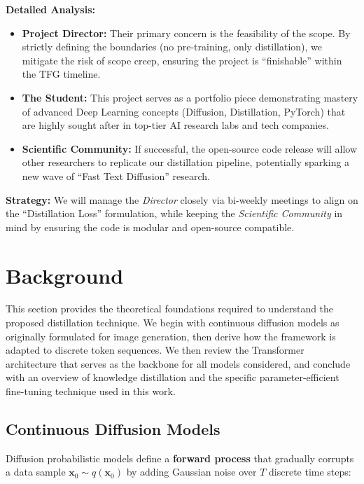 \documentclass[11pt, a4paper]{article}
\begin{document}
\textbf{Detailed Analysis:}
\begin{itemize}
    \item \textbf{Project Director:} Their primary concern is the feasibility of the scope. By strictly defining the boundaries (no pre-training, only distillation), we mitigate the risk of scope creep, ensuring the project is ``finishable'' within the TFG timeline.
    \item \textbf{The Student:} This project serves as a portfolio piece demonstrating mastery of advanced Deep Learning concepts (Diffusion, Distillation, PyTorch) that are highly sought after in top-tier AI research labs and tech companies.
    \item \textbf{Scientific Community:} If successful, the open-source code release will allow other researchers to replicate our distillation pipeline, potentially sparking a new wave of ``Fast Text Diffusion'' research.
\end{itemize}

\noindent \textbf{Strategy:} We will manage the \textit{Director} closely via bi-weekly meetings to align on the ``Distillation Loss'' formulation, while keeping the \textit{Scientific Community} in mind by ensuring the code is modular and open-source compatible.

\section{Background}
\label{sec:background}

This section provides the theoretical foundations required to understand the proposed
distillation technique. We begin with continuous diffusion models as originally formulated
for image generation, then derive how the framework is adapted to discrete token sequences.
We then review the Transformer architecture that serves as the backbone for all models
considered, and conclude with an overview of knowledge distillation and the specific
parameter-efficient fine-tuning technique used in this work.

\subsection{Continuous Diffusion Models}
\label{subsec:continuous_diffusion}

Diffusion probabilistic models \cite{ho2020ddpm} define a \textbf{forward process} that
gradually corrupts a data sample $\mathbf{x}_0 \sim q(\mathbf{x}_0)$ by adding Gaussian
noise over $T$ discrete time steps:
\end{document}
